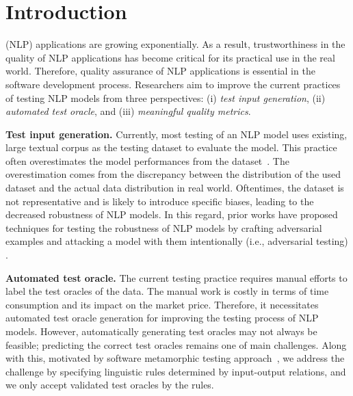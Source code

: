 \section{Introduction}
\label{sec:intro}



\Nlp (NLP) applications are growing exponentially.  As a result,
trustworthiness in the quality of NLP applications has become critical
for its practical use in the real world.  Therefore, quality assurance
of NLP applications is essential in the software
development process.  
Researchers aim to improve the current practices of testing NLP models
from three perspectives: (i) \emph{test input generation}, (ii)
\emph{automated test oracle}, and (iii) \emph{meaningful quality
  metrics}.

\noindent \textbf{Test input generation.} Currently, most testing of
an NLP model uses existing, large textual corpus as the testing
dataset to evaluate the model. This practice often overestimates
the model performances from the \ho
dataset~\cite{patel2018mlevalforsoftware, recht2019imagenetbias,
  marcoACL2020checklist}.  The overestimation comes from the
discrepancy between the distribution of the used dataset and the actual data
distribution in real world. Oftentimes, the \ho dataset is not
representative and is likely to introduce specific biases, leading to the
decreased robustness of NLP models. In this regard, prior works
have proposed techniques for testing the robustness of NLP models by crafting
adversarial examples and attacking a model with them intentionally (i.e., adversarial testing)
\cite{ribeiro2018sear,belinkov2018breaknmt,
  rychalska2019wildnlp,iyyer2018adversarial}.

\noindent \textbf{Automated test oracle.} The current testing practice
requires manual efforts to label the test oracles of the \ho
data. The manual work is costly in terms of time consumption and its
impact on the market price. Therefore, it necessitates automated test
oracle generation for improving the testing process of NLP
models. 
However, automatically generating test oracles may not always
be feasible; predicting the correct test oracles remains one of main
challenges. Along with this, motivated by software metamorphic testing 
approach~\cite{segura2016metamorphictest}, we address the challenge by specifying linguistic rules determined by input-output relations, and we only accept validated test oracles by the rules. 


